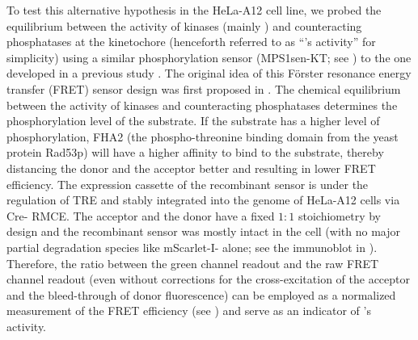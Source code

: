 To test this alternative hypothesis in the HeLa-A12 cell line, we probed the equilibrium between the activity of kinases (mainly ) and counteracting phosphatases at the kinetochore (henceforth referred to as ``'s activity'' for simplicity) using a similar phosphorylation sensor (MPS1sen-KT; see ) to the one developed in a previous study \cite{MPS1senor}. The original idea of this F{\"{o}}rster resonance energy transfer (FRET) sensor design was first proposed in \cite{FHA2BasedFRETSensorOriginalStudy}. The chemical equilibrium between the activity of kinases and counteracting phosphatases determines the phosphorylation level of the substrate. If the substrate has a higher level of phosphorylation, FHA2 (the phospho-threonine binding domain from the yeast protein Rad53p) will have a higher affinity to bind to the substrate, thereby distancing the donor and the acceptor better and resulting in lower FRET efficiency. The expression cassette of the recombinant sensor is under the regulation of TRE and stably integrated into the genome of HeLa-A12 cells via Cre- RMCE. The acceptor and the donor have a fixed $1 : 1$ stoichiometry by design and the recombinant sensor was mostly intact in the cell (with no major partial degradation species like mScarlet-I- alone; see the immunoblot in ). Therefore, the ratio between the green channel readout and the raw FRET channel readout (even without corrections for the cross-excitation of the acceptor and the bleed-through of donor fluorescence) can be employed as a normalized measurement of the FRET efficiency (see ) and serve as an indicator of 's activity.

